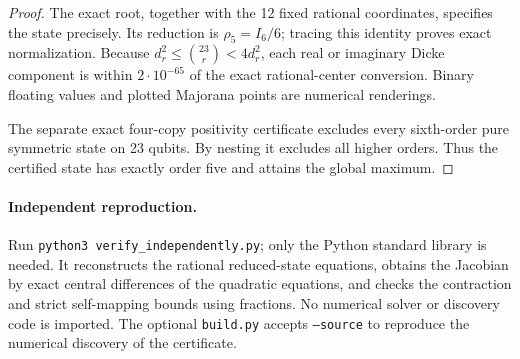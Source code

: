 \documentclass[11pt]{article}
\begin{document}
\begin{proof}
The exact root, together with the 12 fixed rational coordinates, specifies
the state precisely. Its reduction is $\rho_5=I_6/6$; tracing this identity
proves exact normalization. Because
$d_r^2\le\binom{23}{r}<4d_r^2$, each real or imaginary Dicke component is
within $2\cdot10^{-65}$ of the exact rational-center conversion.
Binary floating values and plotted Majorana points are numerical renderings.

The separate exact four-copy positivity certificate excludes every
sixth-order pure symmetric state on 23 qubits. By nesting it excludes all
higher orders. Thus the certified state has exactly order five and attains
the global maximum.
\end{proof}
\paragraph{Independent reproduction.}
Run \texttt{python3 verify\_independently.py}; only the Python standard library
is needed. It reconstructs the rational reduced-state equations, obtains the
Jacobian by exact central differences of the quadratic equations, and checks
the contraction and strict self-mapping bounds using fractions. No numerical
solver or discovery code is imported. The optional \texttt{build.py} accepts
\texttt{--source} to reproduce the numerical discovery of the certificate.
\end{document}
